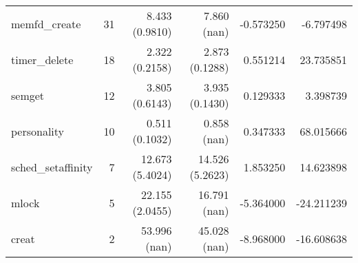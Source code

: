 \begin{longtable}{>{\ttfamily}lrrrrr}
                  memfd\_create &         31 &           8.433 (0.9810) &              7.860 (nan) &       -0.573250 &    -6.797498 \\
                  timer\_delete &         18 &           2.322 (0.2158) &           2.873 (0.1288) &        0.551214 &    23.735851 \\
                         semget &         12 &           3.805 (0.6143) &           3.935 (0.1430) &        0.129333 &     3.398739 \\
                    personality &         10 &           0.511 (0.1032) &              0.858 (nan) &        0.347333 &    68.015666 \\
             sched\_setaffinity &          7 &          12.673 (5.4024) &          14.526 (5.2623) &        1.853250 &    14.623898 \\
                          mlock &          5 &          22.155 (2.0455) &             16.791 (nan) &       -5.364000 &   -24.211239 \\
                          creat &          2 &             53.996 (nan) &             45.028 (nan) &       -8.968000 &   -16.608638 \\
\end{longtable}

